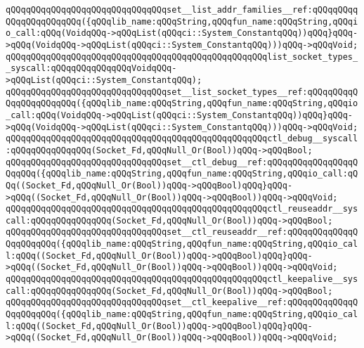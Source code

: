 \verb|qQQqqQQqqQQqqQQqqQQqqQQqqQQqqQQqset__list_addr_families__ref:qQQqqQQqqQQqqQQqqQQqqQQq({qQQqlib_name:qQQqString,qQQqfun_name:qQQqString,qQQqio_call:qQQq(VoidqQQq->qQQqList(qQQqci::System_ConstantqQQq))qQQq}qQQq->qQQq(VoidqQQq->qQQqList(qQQqci::System_ConstantqQQq)))qQQq->qQQqVoid;|\newline
\newline
\verb|qQQqqQQqqQQqqQQqqQQqqQQqqQQqqQQqqQQqqQQqqQQqqQQqqQQqlist_socket_types__syscall:qQQqqQQqqQQqqQQqVoidqQQq->qQQqList(qQQqci::System_ConstantqQQq);|\newline
\verb|qQQqqQQqqQQqqQQqqQQqqQQqqQQqqQQqset__list_socket_types__ref:qQQqqQQqqQQqqQQqqQQqqQQq({qQQqlib_name:qQQqString,qQQqfun_name:qQQqString,qQQqio_call:qQQq(VoidqQQq->qQQqList(qQQqci::System_ConstantqQQq))qQQq}qQQq->qQQq(VoidqQQq->qQQqList(qQQqci::System_ConstantqQQq)))qQQq->qQQqVoid;|\newline
\newline
\verb|qQQqqQQqqQQqqQQqqQQqqQQqqQQqqQQqqQQqqQQqqQQqqQQqqQQqctl_debug__syscall:qQQqqQQqqQQqqQQq(Socket_Fd,qQQqNull_Or(Bool))qQQq->qQQqBool;|\newline
\verb|qQQqqQQqqQQqqQQqqQQqqQQqqQQqqQQqset__ctl_debug__ref:qQQqqQQqqQQqqQQqqQQqqQQq({qQQqlib_name:qQQqString,qQQqfun_name:qQQqString,qQQqio_call:qQQq((Socket_Fd,qQQqNull_Or(Bool))qQQq->qQQqBool)qQQq}qQQq->qQQq((Socket_Fd,qQQqNull_Or(Bool))qQQq->qQQqBool))qQQq->qQQqVoid;|\newline
\newline
\verb|qQQqqQQqqQQqqQQqqQQqqQQqqQQqqQQqqQQqqQQqqQQqqQQqqQQqctl_reuseaddr__syscall:qQQqqQQqqQQqqQQq(Socket_Fd,qQQqNull_Or(Bool))qQQq->qQQqBool;|\newline
\verb|qQQqqQQqqQQqqQQqqQQqqQQqqQQqqQQqset__ctl_reuseaddr__ref:qQQqqQQqqQQqqQQqqQQqqQQq({qQQqlib_name:qQQqString,qQQqfun_name:qQQqString,qQQqio_call:qQQq((Socket_Fd,qQQqNull_Or(Bool))qQQq->qQQqBool)qQQq}qQQq->qQQq((Socket_Fd,qQQqNull_Or(Bool))qQQq->qQQqBool))qQQq->qQQqVoid;|\newline
\newline
\verb|qQQqqQQqqQQqqQQqqQQqqQQqqQQqqQQqqQQqqQQqqQQqqQQqqQQqctl_keepalive__syscall:qQQqqQQqqQQqqQQq(Socket_Fd,qQQqNull_Or(Bool))qQQq->qQQqBool;|\newline
\verb|qQQqqQQqqQQqqQQqqQQqqQQqqQQqqQQqset__ctl_keepalive__ref:qQQqqQQqqQQqqQQqqQQqqQQq({qQQqlib_name:qQQqString,qQQqfun_name:qQQqString,qQQqio_call:qQQq((Socket_Fd,qQQqNull_Or(Bool))qQQq->qQQqBool)qQQq}qQQq->qQQq((Socket_Fd,qQQqNull_Or(Bool))qQQq->qQQqBool))qQQq->qQQqVoid;|\newline
